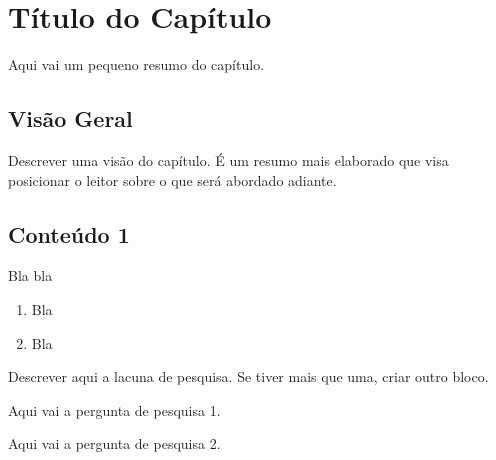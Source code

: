 \chapter{Título do Capítulo}
\label{ch:identificador}
	\begin{resumocapitulo}
		Aqui vai um pequeno resumo do capítulo.
	\end{resumocapitulo}

	\section{Visão Geral}
		Descrever uma visão do capítulo. É um resumo mais elaborado que visa posicionar o leitor sobre o que será abordado adiante.

	\section{Conteúdo 1}
	\label{sec:identificao}
        Bla bla

		\begin{enumerate}
			\item Bla
			\item Bla
		\end{enumerate}

		\begin{lacuna}
		\label{lacuna:lacuna1}
			Descrever aqui a lacuna de pesquisa. Se tiver mais que uma, criar outro bloco.
		\end{lacuna}
	
		\begin{pergunta}
		\label{pergunta:pergunta_1}
			Aqui vai a pergunta de pesquisa 1.
		\end{pergunta}

		\begin{pergunta}
		\label{pergunta:pergunta_2}
			Aqui vai a pergunta de pesquisa 2.
		\end{pergunta}